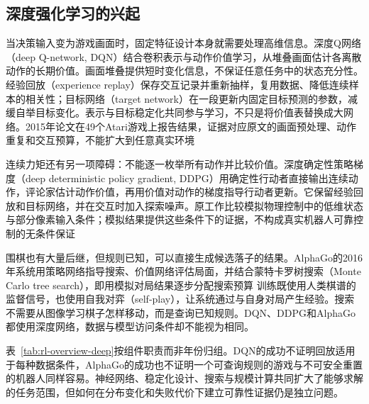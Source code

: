 \subsection{深度强化学习的兴起}
\label{sec:rl-overview-deep}

当决策输入变为游戏画面时，固定特征设计本身就需要处理高维信息。深度Q网络（deep Q-network, DQN）结合卷积表示与动作价值学习，从堆叠画面估计各离散动作的长期价值。画面堆叠提供短时变化信息，不保证任意任务中的状态充分性。经验回放（experience replay）保存交互记录并重新抽样，复用数据、降低连续样本的相关性；目标网络（target network）在一段更新内固定目标预测的参数，减缓自举目标变化。表示与目标稳定化共同参与学习，不只是将价值表替换成大网络。2015年论文在49个Atari游戏上报告结果，证据对应原文的画面预处理、动作重复和交互预算，不能扩大到任意真实环境

连续力矩还有另一项障碍：不能逐一枚举所有动作并比较价值。深度确定性策略梯度（deep deterministic policy gradient, DDPG）用确定性行动者直接输出连续动作，评论家估计动作价值，再用价值对动作的梯度指导行动者更新。它保留经验回放和目标网络，并在交互时加入探索噪声。原工作比较模拟物理控制中的低维状态与部分像素输入条件；模拟结果提供这些条件下的证据，不构成真实机器人可靠控制的无条件保证

围棋也有大量后继，但规则已知，可以直接生成候选落子的结果。AlphaGo的2016年系统用策略网络指导搜索、价值网络评估局面，并结合蒙特卡罗树搜索（Monte Carlo tree search），即用模拟对局结果逐步分配搜索预算
训练既使用人类棋谱的监督信号，也使用自我对弈（self-play），让系统通过与自身对局产生经验。搜索不需要从图像学习棋子怎样移动，而是查询已知规则。DQN、DDPG和AlphaGo都使用深度网络，数据与模型访问条件却不能视为相同。

表~\ref{tab:rl-overview-deep}按组件职责而非年份归组。DQN的成功不证明回放适用于每种数据条件，AlphaGo的成功也不证明一个可查询规则的游戏与不可安全重置的机器人同样容易。神经网络、稳定化设计、搜索与规模计算共同扩大了能够求解的任务范围，但如何在分布变化和失败代价下建立可靠性证据仍是独立问题。

